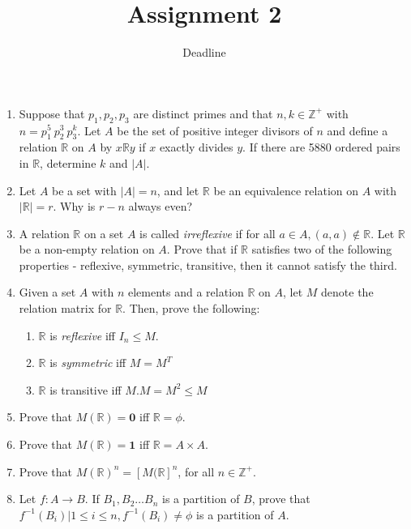 \documentclass[a4paper]{article}
\title{Assignment 2}
\author{Deadline \date{\displaydate{date}} }
\begin{document}
\maketitle


\begin{enumerate}

\item Suppose that $p_1,p_2,p_3$ are distinct primes and that $n,k \in \mathbb{Z}^+$ with $n=p_1^5\ p_2^3\ p_3^k$. Let $A$ be the set of positive integer divisors of $n$ and define a relation $\mathbb{R}$ on $A$ by $x\mathbb{R}y$ if $x$ exactly divides $y$. If there are 5880 ordered pairs in $\mathbb{R}$, determine $k$ and $|A|$. 

\item Let $A$ be a set with $|A|=n$, and let $\mathbb{R}$ be an equivalence relation on $A$ with $|\mathbb{R}| = r$. Why is $r-n$ always even?

\item A relation $\mathbb{R}$ on a set $A$ is called \textit{irreflexive} if for all $a \in A, (a,a) \notin \mathbb{R}$. Let $\mathbb{R}$ be a non-empty relation on $A$. Prove that if $\mathbb{R}$ satisfies two of the following properties - reflexive, symmetric, transitive, then it cannot satisfy the third.

\item Given a set $A$ with $n$ elements and a relation $\mathbb{R}$ on $A$, let $M$ denote the relation matrix for $\mathbb{R}$. Then, prove the following:
\begin{enumerate}
\item $\mathbb{R}$ is \textit{reflexive} iff $I_n \leq M$.
\item $\mathbb{R}$ is \textit{symmetric} iff $M=M^T$
\item $\mathbb{R}$ is transitive iff $M.M = M^2 \leq M$
\end{enumerate}

\item Prove that $M(\mathbb{R}) = \textbf{0}$ iff $\mathbb{R} = \phi$.

\item Prove that $M(\mathbb{R}) = \textbf{1}$ iff $\mathbb{R} = A \times A$.

\item Prove that $M(\mathbb{R})^n = [M(\mathbb{R}]^n$, for all $n \in \mathbb{Z}^+$. 

\item Let $f: A \rightarrow B$. If {$B_1,B_2 \dots B_n$} is a partition of $B$, prove that {$f^{-1}(B_i)| 1\leq i \leq n, f^{-1}(B_i) \neq \phi $} is a partition of $A$. 


\end{enumerate}
\end{document}
